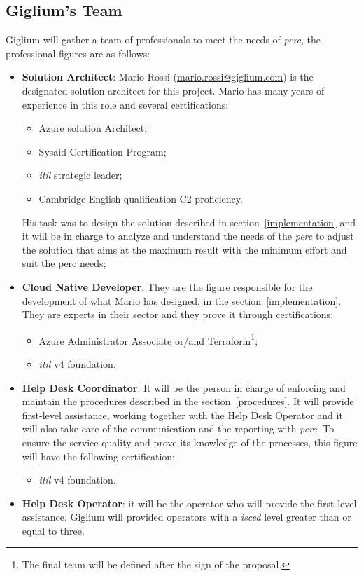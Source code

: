 \subsection{Giglium's Team}
Giglium will gather a team of professionals to meet the needs of \textit{\gls{perc}}, the professional figures are as follows:
\begin{itemize}
	\item \textbf{Solution Architect}: Mario Rossi (\href{mailto:mario.rossi@giglium.com}{mario.rossi@giglium.com}) is the designated solution architect for this project. Mario has many years of experience in this role and several certifications:
	\begin{itemize}
		\item Azure solution Architect\cite{azure_solution_architect_certification};
		\item Sysaid Certification Program\cite{sysaid_certification};
		\item \textit{\gls{itil}} strategic leader\cite{itil_strategic_certification};
		\item Cambridge English qualification C2 proficiency\cite{c2_certification}.
	\end{itemize}
	His task was to design the solution described in section~\ref{implementation} and it will be in charge to analyze and understand the needs of the \textit{\gls{perc}} to adjust the solution that aims at the maximum result with the minimum effort and suit the \gls{perc} needs;
	
	\item \textbf{Cloud Native Developer}: They are the figure responsible for the development of what Mario has designed, in the section~\ref{implementation}. They are experts in their sector and they prove it through certifications:
	\begin{itemize}
		\item Azure Administrator Associate\cite{azure_administrator_certification} or/and Terraform\cite{terraform_associate_certification}\footnote{The final team will be defined after the sign of the proposal.};
		\item \textit{\gls{itil}} v4 foundation\cite{itil_foundation_certification}.
	\end{itemize}
	\item \textbf{Help Desk Coordinator}: It will be the person in charge of enforcing and maintain the procedures described in the section~\ref{procedures}. It will provide first-level assistance, working together with the Help Desk Operator and it will also take care of the communication and the reporting with \textit{\gls{perc}}. To ensure the  service quality and prove its knowledge of the processes, this figure will have the following certification:
	\begin{itemize}
		\item \textit{\gls{itil}} v4 foundation\cite{itil_foundation_certification}.
	\end{itemize}
	\item \textbf{Help Desk Operator}: it will be the operator who will provide the first-level assistance. Giglium  will provided operators with a \textit{\gls{isced}} level greater than or equal to three.
\end{itemize}

